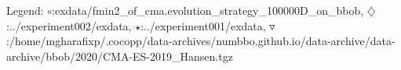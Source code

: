 Legend: {\color{NavyBlue}$\circ$}:exdata/fmin2\_of\_cma.evolution\_strategy\_100000D\_on\_bbob, {\color{Magenta}$\diamondsuit$}:../experiment002/exdata, {\color{Orange}$\star$}:../experiment001/exdata, {\color{CornflowerBlue}$\triangledown$}:/home/mgharafixp/.cocopp/data-archives/numbbo.github.io/data-archive/data-archive/bbob/2020/CMA-ES-2019\_Hansen.tgz